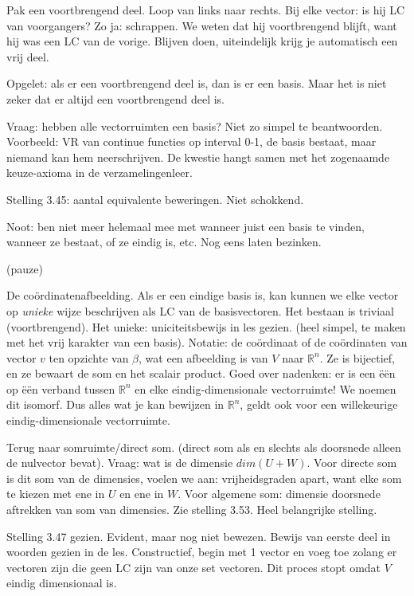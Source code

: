 \documentclass{article}
\begin{document}
Pak een voortbrengend deel. Loop van links naar rechts. Bij elke vector: is hij LC van voorgangers? Zo ja: schrappen. We weten dat hij voortbrengend blijft, want hij was een LC van de vorige. Blijven doen, uiteindelijk krijg je automatisch een vrij deel. 

Opgelet: als er een voortbrengend deel is, dan is er een basis. Maar het is niet zeker dat er altijd een voortbrengend deel is. 

Vraag: hebben alle vectorruimten een basis? Niet zo simpel te beantwoorden. 
Voorbeeld: VR van continue functies op interval 0-1, de basis bestaat, maar niemand kan hem neerschrijven. 
De kwestie hangt samen met het zogenaamde keuze-axioma in de verzamelingenleer. 

Stelling 3.45: aantal equivalente beweringen. Niet schokkend. 

Noot: ben niet meer helemaal mee met wanneer juist een basis te vinden, wanneer ze bestaat, of ze eindig is, etc. Nog eens laten bezinken. 

(pauze)

De co\"ordinatenafbeelding. Als er een eindige basis is, kan kunnen we elke vector op \emph{unieke} wijze beschrijven als LC van de basisvectoren. Het bestaan is triviaal (voortbrengend). Het unieke: uniciteitsbewijs in les gezien. (heel simpel, te maken met het vrij karakter van een basis). 
Notatie: de co\"ordinaat of de co\"ordinaten van vector $v$ ten opzichte van $\beta$, wat een afbeelding is van $V$ naar $\mathbb{R}^n$. Ze is bijectief, en ze bewaart de som en het scalair product. 
Goed over nadenken: er is een \"e\"en op \"e\"en verband tussen $\mathbb{R}^n$ en elke eindig-dimensionale vectorruimte! We noemen dit isomorf. Dus alles wat je kan bewijzen in $\mathbb{R}^n$, geldt ook voor een willekeurige eindig-dimensionale vectorruimte. 

Terug naar somruimte/direct som. (direct som als en slechts als doorsnede alleen de nulvector bevat). Vraag: wat is de dimensie $dim(U+W)$. Voor directe som is dit som van de dimensies, voelen we aan: vrijheidsgraden apart, want elke som te kiezen met ene in $U$ en ene in $W$. Voor algemene som: dimensie doorsnede aftrekken van som van dimensies. Zie stelling 3.53. Heel belangrijke stelling. 

Stelling 3.47 gezien. Evident, maar nog niet bewezen. Bewijs van eerste deel in woorden gezien in de les. Constructief, begin met 1 vector en voeg toe zolang er vectoren zijn die geen LC zijn van onze set vectoren. Dit proces stopt omdat $V$ eindig dimensionaal is. 
\end{document}
